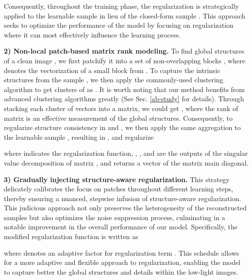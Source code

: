 \documentclass{article}
\begin{document}
Consequently, throughout the training phase, the regularization is strategically applied to the learnable sample  in lieu of the closed-form sample . This approach seeks to optimize the performance of the model by focusing on regularization where it can most effectively influence the learning process.

\textbf{2) Non-local patch-based matrix rank modeling.}
To find global structures of a clean image , we first patchify it into a set of non-overlapping blocks , where  denotes the vectorization of a small block from .
To capture the intrinsic structures from the sample , we then apply the commonly-used clustering algorithm to get  clusters of  as .
It is worth noting that our method benefits from advanced clustering algorithms greatly (See Sec. \ref{ab-study} for details). Through stacking each cluster of vectors into a matrix, we could get , where the rank of matrix  is an effective measurement of the global structures. Consequently, to regularize structure consistency in  and , we then apply the same aggregation to the learnable sample , resulting in , and regularize

where  indicates the regularization function, , , and  are the outputs of the singular value decomposition of matrix , and  returns a vector of the matrix main diagonal.



\textbf{3) Gradually injecting structure-aware regularization.}
This strategy delicately calibrates the focus on patches throughout different learning steps, thereby ensuring a nuanced, stepwise infusion of structure-aware regularization. This judicious approach not only preserves the heterogeneity of the reconstructed samples but also optimizes the noise suppression process, culminating in a notable improvement in the overall performance of our model. Specifically, the modified regularization function  is written as

where  denotes an adaptive factor for regularization term . This schedule allows for a more adaptive and flexible approach to regularization, enabling the model to capture better the global structures and details within the low-light images.
\end{document}

